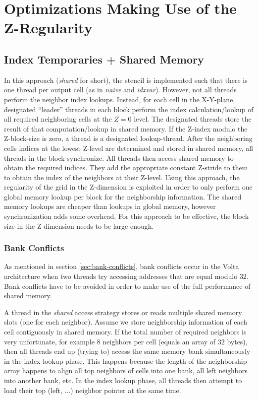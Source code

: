 \section{Optimizations Making Use of the Z-Regularity}

\subsection{Index Temporaries + Shared Memory} In this approach (\emph{shared} for short), the stencil is implemented such that there is one thread per output cell (as in \emph{naive} and \emph{idxvar}). However, not all threads perform the neighbor index lookups. Instead, for each cell in the X-Y-plane, designated ``leader'' threads in each block perform the index calculation/lookup of all required neighboring cells at the $Z=0$ level. The designated threads store the result of that computation/lookup in shared memory. If the Z-index modulo the Z-block-size is zero, a thread is a designated lookup-thread. After the neighboring cells indices at the lowest Z-level are determined and stored in shared memory, all threads in the block synchronize. All threads then access shared memory to obtain the required indices. They add the appropriate constant Z-stride to them to obtain the index of the neighbors at their Z-level. Using this approach, the regularity of the grid in the Z-dimension is exploited in order to only perform one global memory lookup per block for the neighborship information. The shared memory lookups are cheaper than lookups in global memory, however synchronization adds some overhead. For this approach to be effective, the block size in the Z dimension needs to be large enough.

\subsubsection{Bank Conflicts}

As mentioned in section \ref{sec:bank-conflicts}, bank conflicts occur in the Volta architecture when two threads try accessing addresses that are equal modulo $32$. Bank conflicts have to be avoided in order to make use of the full performance of shared memory.

A thread in the \emph{shared} access strategy stores or reads multiple shared memory slots (one for each neighbor). Assume we store neighborship information of each cell contiguously in shared memory. If the total number of required neighbors is very unfortunate, for example $8$ neighbors per cell (equals an array of $32$ bytes), then all threads end up (trying to) access the same memory bank simultaneously in the index lookup phase. This happens because the length of the neighborship array happens to align all top neighbors of cells into one bank, all left neighbors into another bank, etc. In the index lookup phase, all threads then attempt to load their top (left, ...) neighbor pointer at the same time.

